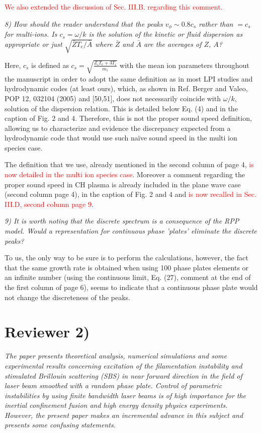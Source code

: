 \documentclass{article}
\def\tc{\textcolor{red}}
\begin{document}
\tc{We also extended the discussion of Sec. III.B. regarding this comment.}

\textit{
8) How should the reader understand that the peaks $ v_\phi \sim 0.8c_s $ rather than $= c_s$ for
multi-ions. Is $c_s =\omega/k$ is the solution of the kinetic or fluid dispersion as appropriate or just $\sqrt{\bar{Z}T_e/\bar{A}}$ where $\bar{Z}$
  and  $\bar{A} $ are the averages of $Z$, $A$?}
  
Here,   $c_s$ is defined as $c_s=\sqrt{\frac{Z_iT_e +3T_i}{m_i}}$ with the mean ion parameters throughout the manuscript in order to adopt the same definition as in most LPI studies and hydrodynamic codes (at least ours), which, as shown in Ref. Berger and Valeo, POP 12, 032104 (2005) and [50,51], does not necessarily coincide with $\omega/k$,  solution of the dispersion relation.
This is detailed below Eq.  (4) and in the caption of Fig. 2 and 4. 
Therefore, this is not the proper sound speed definition, allowing us to characterize and evidence the discrepancy expected from a hydrodynamic code that would use such na\"ive sound speed in the multi ion species case. 

The definition that we use,   already mentioned in the second column of page 4, \tc{is now detailed in the multi ion species case}. Moreover a comment regarding the proper sound speed in CH plasma is already included  in the plane wave case (second column page 4), in the caption of Fig. 2 and 4 and \tc{is now recalled in Sec. III.D, second column page 9}.
  
\textit{
9) It is worth noting that the discrete spectrum is a consequence of the RPP model.
Would a representation for continuous phase ’plates’ eliminate the discrete peaks?
}

To us, the only way to be sure is to perform the calculations, however, the fact that the same growth rate is  obtained when using 100 phase plates elements or  an infinite number (using the continuous limit, Eq. (27), comment at the end of the first column of page 6), seems to indicate that a continuous phase plate would not change the discreteness of the peaks. 

\section{Reviewer 2)}
\textit{
The paper presents theoretical analysis, numerical simulations and some experimental results concerning excitation of the filamentation instability and stimulated Brillouin scattering (SBS) in near forward direction in the field of laser beam smoothed with a random phase plate. Control of parametric instabilities by using finite bandwidth laser beams is of high importance for the inertial confinement fusion and high energy density physics experiments. However, the present paper makes an incremental advance in this subject and presents some confusing statements. }
\end{document}

